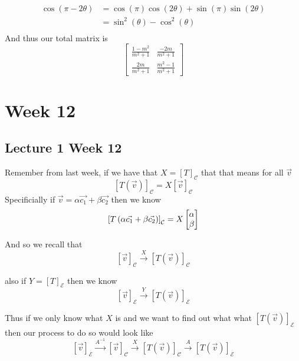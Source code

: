 \documentclass[11pt]{book}
\begin{document}
\begin{itemize}
\begin{align*}
            \cos  \left( \pi  - 2\theta  \right) &= \cos  \left( \pi  \right) \cos  \left( 2\theta  \right) + \sin \left( \pi  \right) \sin \left( 2\theta  \right)  \\
            &= \sin^2  \left( \theta \right)  - \cos ^2  \left( \theta \right)  \\
        \end{align*}
        And thus our total matrix is 
        \[
        \begin{bmatrix}
        	\frac{1 - m^2 }{m^2  + 1} &  \frac{-2m}{m^2  + 1} \\
        	\frac{2m}{m^2 + 1 } &  \frac{m^2  - 1}{m^2  + 1}
        \end{bmatrix}
        \]
        
\end{itemize}




\chapter{Week 12}%
\label{chp:week_12}

\section{Lecture 1 Week 12}%
\label{sec:lecture_1_week_12}

Remember from last week, if we have that $X= \left[ T \right]_{\mathcal{C}} $ that that means for all $\vec{v} $ 
\[
\left[ T\left(\vec{v} \right) \right]_{\mathcal{C}} = X\left[ \vec{v}  \right]_{\mathcal{C}} 
\]
Specificially if $\vec{v} = \alpha \vec{c_1}  + \beta \vec{c_2} $ then we know
\[
\left[ T\left(\alpha \vec{c_1}  + \beta \vec{c_2} \right) \right]_{\mathcal{C}} = X\begin{bmatrix} \alpha  \\ \beta  \end{bmatrix} 
\]

And so we recall that 
\[
\left[ \vec{v}  \right]_{\mathcal{C}} \xrightarrow{X} \left[ T\left(\vec{v} \right) \right]_{\mathcal{C}} 
\]

also if $Y= \left[ T\right]_{\mathcal{E}} $ then we know
\[
\left[ \vec{v}  \right]_{\mathcal{E}} \xrightarrow{Y} \left[ T\left(\vec{v} \right) \right]_{\mathcal{E}} 
\]

Thus if we only know what $X$ is and we want to find out what what $\left[ T\left(\vec{v} \right) \right]_{\mathcal{E}} $ then our process to do so would look like
\begin{equation*}
    \left[ \vec{v}  \right]_{\mathcal{E}} \xrightarrow{A^{-1} } \left[ \vec{v}  \right]_{\mathcal{C}} \xrightarrow{X} \left[ T\left(\vec{v} \right) \right]_{\mathcal{C}} \xrightarrow{A} \left[ T\left(\vec{v} \right) \right]_{\mathcal{E}} 
\end{equation*}
\end{document}
